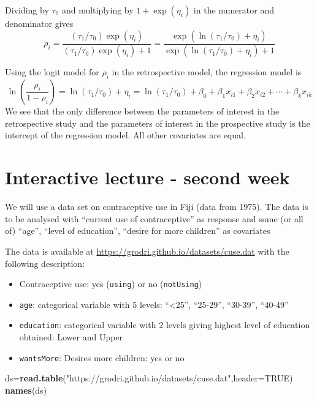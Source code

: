 \documentclass[
]{article}
\newenvironment{Shaded}{\begin{snugshade}}{\end{snugshade}}
\newcommand{\AttributeTok}[1]{\textcolor[rgb]{0.13,0.29,0.53}{#1}}
\newcommand{\ConstantTok}[1]{\textcolor[rgb]{0.56,0.35,0.01}{#1}}
\newcommand{\FunctionTok}[1]{\textcolor[rgb]{0.13,0.29,0.53}{\textbf{#1}}}
\newcommand{\NormalTok}[1]{#1}
\newcommand{\OtherTok}[1]{\textcolor[rgb]{0.56,0.35,0.01}{#1}}
\newcommand{\StringTok}[1]{\textcolor[rgb]{0.31,0.60,0.02}{#1}}
\providecommand{\tightlist}{%
  \setlength{\itemsep}{0pt}\setlength{\parskip}{0pt}}
\begin{document}
Dividing by \(\tau_0\) and multiplying by \(1+\exp(\eta_i)\) in the
numerator and denominator gives
\[ \rho_i= \frac{(\tau_1/\tau_0) \exp(\eta_i)}{(\tau_1/\tau_0) \exp(\eta_i) + 1} = \frac{\exp(\ln(\tau_1/\tau_0) + \eta_i)}{\exp(\ln(\tau_1/\tau_0) + \eta_i) + 1}\]

Using the logit model for \(\rho_i\) in the retrospective model, the
regression model is
\[ \ln (\frac{\rho_i}{1-\rho_i}) = \ln(\tau_1/\tau_0) + \eta_i = \ln(\tau_1/\tau_0) + \beta_0+\beta_1 x_{i1}+\beta_2 x_{i2}+\cdots + \beta_k x_{ik} \]
We see that the only difference between the parameters of interest in
the retrospective study and the parameters of interest in the
prospective study is the intercept of the regression model. All other
covariates are equal.

\hypertarget{interactive-lecture---second-week}{%
\section{Interactive lecture - second
week}\label{interactive-lecture---second-week}}

We will use a data set on contraceptive use in Fiji (data from 1975).
The data is to be analysed with ``current use of contraceptive'' as
response and some (or all of) ``age'', ``level of education'', ``desire
for more children'' as covariates

The data is available at
\url{https://grodri.github.io/datasets/cuse.dat} with the following
description:

\begin{itemize}
\tightlist
\item
  Contraceptive use: yes (\texttt{using}) or no (\texttt{notUsing})
\item
  \texttt{age}: categorical variable with 5 levels: ``\textless25'',
  ``25-29'', ``30-39'', ``40-49''
\item
  \texttt{education}: categorical variable with 2 levels giving highest
  level of education obtained: Lower and Upper
\item
  \texttt{wantsMore}: Desires more children: yes or no
\end{itemize}

\begin{Shaded}
\begin{Highlighting}[]
\NormalTok{ds}\OtherTok{=}\FunctionTok{read.table}\NormalTok{(}\StringTok{"https://grodri.github.io/datasets/cuse.dat"}\NormalTok{,}\AttributeTok{header=}\ConstantTok{TRUE}\NormalTok{)}
\FunctionTok{names}\NormalTok{(ds)}
\end{Highlighting}
\end{Shaded}
\end{document}
